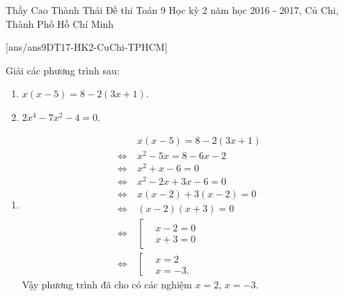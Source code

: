 \begin{name}
{Thầy Cao Thành Thái}
{Đề thi Toán 9 Học kỳ 2 năm học 2016 - 2017, Củ Chi, Thành Phố Hồ Chí Minh}
\end{name}
\setcounter{ex}{0}
[ans/ans9DT17-HK2-CuChi-TPHCM]


\begin{ex}%
 Giải các phương trình sau:
 \begin{enumerate}
  \item $x(x - 5) = 8 - 2(3x + 1)$.
  \item $2x^4 - 7x^2 - 4 = 0$.
 \end{enumerate}
 \loigiai
  {
  \begin{enumerate}
   \item \allowdisplaybreaks
   \begin{align*}
    				& x(x - 5) = 8 - 2(3x + 1) \\
    \Leftrightarrow \ & x^2 - 5x = 8 - 6x - 2 \\
    \Leftrightarrow \ & x^2 + x - 6 = 0 \\
    \Leftrightarrow \ & x^2 - 2x + 3x - 6 = 0 \\
    \Leftrightarrow \ & x(x - 2) + 3(x - 2) = 0 \\
    \Leftrightarrow \ & (x - 2)(x + 3) = 0 \\
    \Leftrightarrow \ & \left[ \begin{aligned} & x - 2 = 0 \\& x + 3 = 0 \end{aligned} \right. \\
    \Leftrightarrow \ & \left[ \begin{aligned} & x = 2 \\& x = -3. \end{aligned} \right.
   \end{align*}
   Vậy phương trình đã cho có các nghiệm $x = 2$, $x = -3$.
   

\end{enumerate}}
\end{ex}
